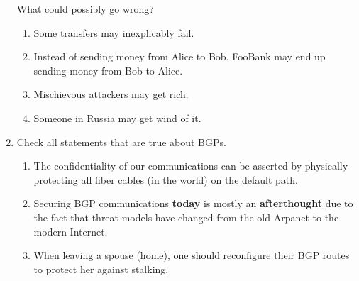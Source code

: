 \documentclass{article} %
\newcommand{\incorrectOption}{\textbf{\Circle}}
\begin{document}
\begin{enumerate}[leftmargin=*, label=\textbf{Q\arabic*}, itemsep=-5pt]
What could possibly go wrong? 
  \begin{enumerate}[itemsep=-3.5pt, label={}]
  \item[\incorrectOption]  Some transfers may inexplicably fail.
  \item[\incorrectOption]  Instead of sending money from Alice to Bob, FooBank may end
      up sending money from Bob to Alice.
    \item[\incorrectOption]  Mischievous attackers may get rich.
    \item[\incorrectOption]  Someone in Russia may get wind of it.
    \end{enumerate}
%
  \item Check all statements that are true about BGPs.\\
  \begin{enumerate}[itemsep=-3.5pt, label={}]
  \item[\incorrectOption]  The confidentiality of our communications
    can be asserted by physically protecting all fiber cables (in the
    world) on the default path.  
  \item[\incorrectOption] Securing BGP communications \textbf{today}
    is mostly an \textbf{afterthought} due to the fact that threat
    models have changed from the old Arpanet to the modern Internet.
  \item[\incorrectOption]  When leaving a spouse (home), one should
    reconfigure their BGP routes to protect her against stalking.
  \end{enumerate}
  \end{enumerate}
\end{document}
